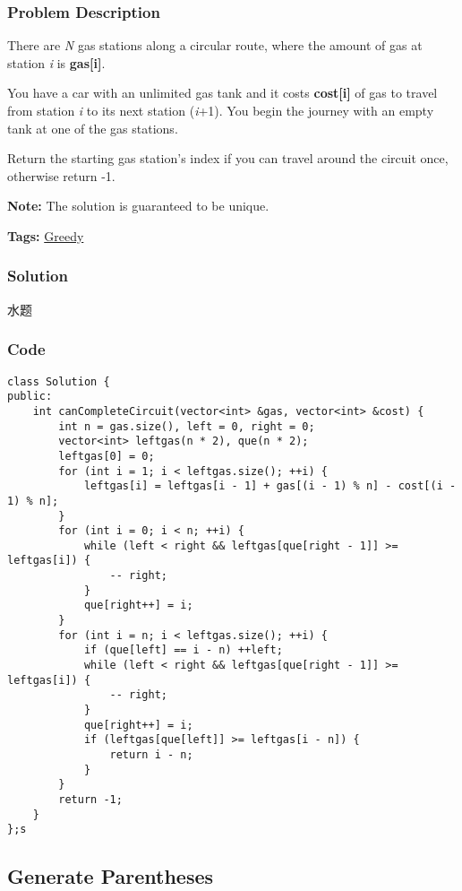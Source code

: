 \documentclass{article}
\begin{document}
\begin{CJK*}{UTF8}{gkai}
\subsubsection*{Problem Description}
There are \emph{N} gas stations along a circular route, where the amount of gas at station \emph{i} is \textbf{gas[i]}.

You have a car with an unlimited gas tank and it costs \textbf{cost[i]} of gas to travel from station \emph{i} to its next station (\emph{i}+1). You begin the journey with an empty tank at one of the gas stations.

Return the starting gas station's index if you can travel around the circuit once, otherwise return -1.

\textbf{Note:}
The solution is guaranteed to be unique.


\textbf{Tags: }
\hyperref[ Greedy ]{ Greedy }



\subsubsection*{Solution}
水题

\subsubsection*{Code}
\begin{lstlisting}
class Solution {
public:
    int canCompleteCircuit(vector<int> &gas, vector<int> &cost) {
        int n = gas.size(), left = 0, right = 0;
        vector<int> leftgas(n * 2), que(n * 2);
        leftgas[0] = 0;
        for (int i = 1; i < leftgas.size(); ++i) {
            leftgas[i] = leftgas[i - 1] + gas[(i - 1) % n] - cost[(i - 1) % n];
        }
        for (int i = 0; i < n; ++i) {
            while (left < right && leftgas[que[right - 1]] >= leftgas[i]) {
                -- right;
            }
            que[right++] = i;
        }
        for (int i = n; i < leftgas.size(); ++i) {
            if (que[left] == i - n) ++left;
            while (left < right && leftgas[que[right - 1]] >= leftgas[i]) {
                -- right;
            }
            que[right++] = i;
            if (leftgas[que[left]] >= leftgas[i - n]) {
                return i - n;
            }
        }
        return -1;
    }
};s 
\end{lstlisting}


\subsection{ Generate Parentheses }
\label{ Generate Parentheses }


\end{CJK*}
\end{document}
